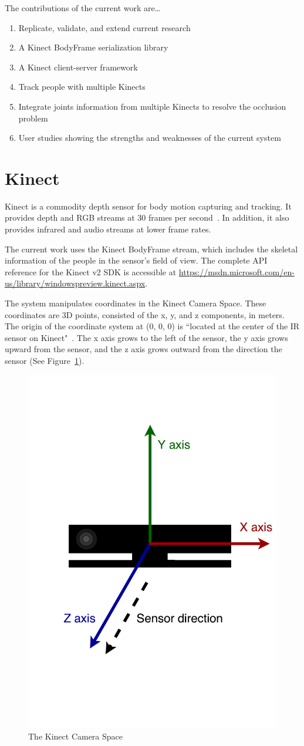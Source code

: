 The contributions of the current work are\ldots

\begin{enumerate}
  \item Replicate, validate, and extend current research
  \item A Kinect BodyFrame serialization library
  \item A Kinect client-server framework
  \item Track people with multiple Kinects
  \item Integrate joints information from multiple Kinects to resolve the occlusion problem
  \item User studies showing the strengths and weaknesses of the current system
\end{enumerate}

\section{Kinect}
\label{sec:introduction_kinect}

Kinect is a commodity depth sensor for body motion capturing and tracking. It provides depth and RGB streams at 30 frames per second~\cite{kinect_sensor_specs}. In addition, it also provides infrared and audio streams at lower frame rates.

The current work uses the Kinect BodyFrame stream, which includes the skeletal information of the people in the sensor's field of view. The complete API reference for the Kinect v2 SDK is accessible at \url{https://msdn.microsoft.com/en-us/library/windowspreview.kinect.aspx}.

The system manipulates coordinates in the Kinect Camera Space. These coordinates are 3D points, consisted of the x, y, and z components, in meters. The origin of the coordinate system at (0, 0, 0) is ``located at the center of the IR sensor on Kinect"~\cite{microsoft_kinect_coordinates}. The x axis grows to the left of the sensor, the y axis grows upward from the sensor, and the z axis grows outward from the direction the sensor (See Figure~\ref{fig:kinect_camera_space}).


\begin{figure}[!h]
  \centering

  \includegraphics[width=0.5\linewidth]{figs/kinect_camera_space}
  
  \caption{The Kinect Camera Space}
  
  \label{fig:kinect_camera_space}
\end{figure}


